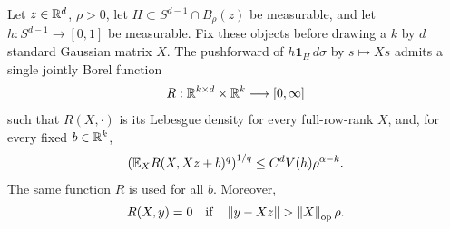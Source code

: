 \begin{lemma}
\label{p:riesz-density}
Let $z\in\mathbb R^d$, $\rho>0$, let
$H\subset S^{d-1}\cap B_\rho(z)$ be measurable, and let
$h:S^{d-1}\to[0,1]$ be measurable. Fix these objects before drawing a
$k$ by $d$ standard Gaussian matrix $X$. The pushforward of
$h\mathbf 1_H\,d\sigma$ by $s\mapsto Xs$ admits a single jointly
Borel function
\[
 R:\mathbb R^{k\times d}\times\mathbb R^k\longrightarrow[0,\infty]
\]
such that $R(X,\cdot)$ is its Lebesgue density for every full-row-rank
$X$, and, for every fixed $b\in\mathbb R^k$,
\begin{equation}\label{p:riesz-density-bound}
 \left(\mathbb E_X R(X,Xz+b)^q\right)^{1/q}
 \le C^d V(h)\rho^{\alpha-k}.
\end{equation}
The same function $R$ is used for all $b$.  Moreover,
\begin{equation}\label{p:riesz-density-support}
 R(X,y)=0
 \quad\hbox{if}\quad
 \left\lVert y-Xz\right\rVert>\left\lVert X\right\rVert_{\mathrm{op}}\rho .
\end{equation}
\end{lemma}

